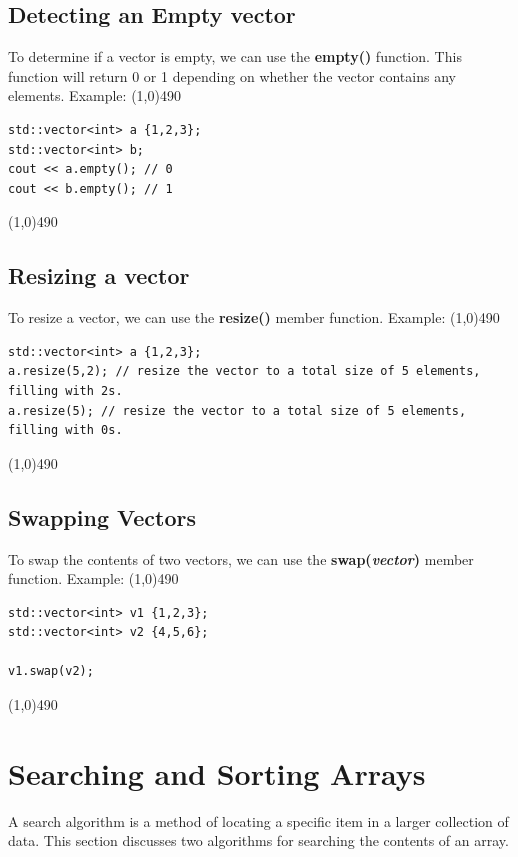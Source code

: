 \documentclass{report}
\begin{document}
    \bigbreak \noindent 
    \subsection{Detecting an Empty vector}
    \bigbreak \noindent 
    To determine if a vector is empty, we can use the \textbf{empty()} function. This function will return 0 or 1 depending on whether the vector contains any elements.
    \bigbreak \noindent 
    Example:
    \bigbreak \noindent 
    \line(1,0){490}
    \begin{verbatim}
std::vector<int> a {1,2,3};
std::vector<int> b;
cout << a.empty(); // 0
cout << b.empty(); // 1
    \end{verbatim}
    \line(1,0){490}

    \bigbreak \noindent 
    \subsection{Resizing a vector}
    \bigbreak \noindent 
    To resize a vector, we can use the \textbf{resize()} member function.
    \bigbreak \noindent 
    Example:
    \bigbreak \noindent 
    \line(1,0){490}
    \begin{verbatim}
std::vector<int> a {1,2,3};
a.resize(5,2); // resize the vector to a total size of 5 elements, filling with 2s.
a.resize(5); // resize the vector to a total size of 5 elements, filling with 0s.
    \end{verbatim}
    \line(1,0){490}

    \bigbreak \noindent 
    \subsection{Swapping Vectors}
    \bigbreak \noindent 
    To swap the contents of two vectors, we can use the \textbf{swap(\textit{vector})} member function.
    \bigbreak \noindent 
    Example:
    \bigbreak \noindent 
    \line(1,0){490}
    \begin{verbatim}
std::vector<int> v1 {1,2,3};
std::vector<int> v2 {4,5,6};

v1.swap(v2);
    \end{verbatim}
    \line(1,0){490}

    \pagebreak \bigbreak \noindent 
    \section{\LARGE Searching and Sorting Arrays}
    \bigbreak \noindent 
    \begin{concept}
 A search algorithm is a method of locating a specific item in a larger collection of data. This section discusses two algorithms for searching the contents of an array.
	\end{concept}
    \bigbreak \noindent 
\end{document}
